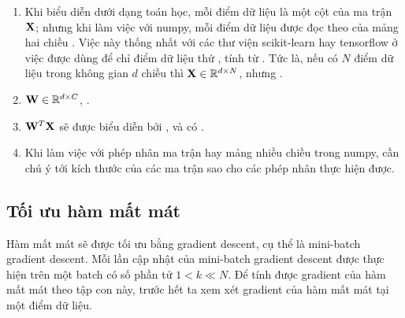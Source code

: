 \begin{mydeff}
\begin{enumerate}
\item Khi biểu diễn dưới dạng toán học, mỗi điểm dữ liệu là một cột của ma trận
$\mathbf{X}$; nhưng khi làm việc với numpy, mỗi điểm dữ liệu được đọc theo
 của mảng hai chiều .
Việc này
thống nhất với các thư viện scikit-learn hay tensorflow ở việc
 được dùng để chỉ điểm dữ liệu thứ , tính
từ . Tức là, nếu có $N$ điểm dữ liệu trong không gian $d$
chiều thì $\mathbf{X} \in \mathbb{R}^{d \times N}$, nhưng .

\item $\mathbf{W} \in \mathbb{R}^{d\times C}$, .

\item $\mathbf{W}^T\mathbf{X}$ sẽ được biểu diễn bởi , và có
.

\item Khi làm việc với phép nhân ma trận hay mảng nhiều chiều trong numpy,
cần chú ý tới kích thước của các ma trận sao cho các phép nhân thực
hiện được.

\end{enumerate}

\end{mydeff}


\subsection{Tối ưu hàm mất mát }


Hàm mất mát sẽ được tối ưu bằng gradient descent, cụ thể là mini-batch
gradient descent.
Mỗi lần cập nhật của mini-batch gradient descent được thực hiện trên một
{batch} có số phần tử $1 < k \ll N$. Để tính được gradient của hàm mất
mát theo tập con này, trước hết ta xem xét gradient của hàm mất mát tại một điểm
dữ liệu.

